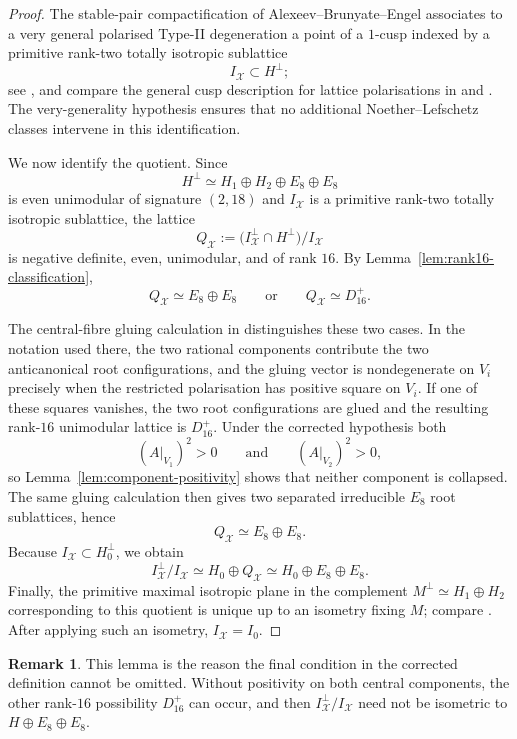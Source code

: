 \documentclass[11pt]{amsart}
\theoremstyle{definition}
\newtheorem{remark}[theorem]{Remark}
\newcommand{\cX}{\mathcal X}
\begin{document}
\begin{proof}
The stable-pair compactification of Alexeev--Brunyate--Engel associates to a
very general polarised Type-II degeneration a point of a $1$-cusp indexed by a
primitive rank-two totally isotropic sublattice
\[
I_{\cX}\subset H^\perp;
\]
see \cite{ABE22}, and compare the general cusp description for lattice
polarisations in \cite[Section~3]{GT24} and \cite[Section~3.1]{DPT23}.  The
very-generality hypothesis ensures that no additional Noether--Lefschetz
classes intervene in this identification.

We now identify the quotient.  Since
\[
H^\perp\simeq H_1\oplus H_2\oplus E_8\oplus E_8
\]
is even unimodular of signature $(2,18)$ and $I_{\cX}$ is a primitive
rank-two totally isotropic sublattice, the lattice
\[
Q_{\cX}
 :=
\bigl(I_{\cX}^{\perp}\cap H^\perp\bigr)/I_{\cX}
\]
is negative definite, even, unimodular, and of rank $16$.  By
Lemma~\ref{lem:rank16-classification},
\[
Q_{\cX}\simeq E_8\oplus E_8
\qquad\text{or}\qquad
Q_{\cX}\simeq D_{16}^{+}.
\]

The central-fibre gluing calculation in \cite[Section~3]{GT24} distinguishes
these two cases.  In the notation used there, the two rational components
contribute the two anticanonical root configurations, and the gluing vector is
nondegenerate on $V_i$ precisely when the restricted polarisation has positive
square on $V_i$.  If one of these squares vanishes, the two root
configurations are glued and the resulting rank-$16$ unimodular lattice is
$D_{16}^{+}$.  Under the corrected hypothesis both
\[
(A|_{V_1})^2>0
\qquad\text{and}\qquad
(A|_{V_2})^2>0,
\]
so Lemma~\ref{lem:component-positivity} shows that neither component is
collapsed.  The same gluing calculation then gives two separated irreducible
$E_8$ root sublattices, hence
\[
Q_{\cX}\simeq E_8\oplus E_8.
\]
Because $I_{\cX}\subset H_0^\perp$, we obtain
\[
I_{\cX}^{\perp}/I_{\cX}
\simeq
H_0\oplus Q_{\cX}
\simeq
H_0\oplus E_8\oplus E_8.
\]
Finally, the primitive maximal isotropic plane in the complement
$M^\perp\simeq H_1\oplus H_2$ corresponding to this quotient is unique up to
an isometry fixing $M$; compare \cite[Section~3.1]{DPT23}.  After applying
such an isometry, $I_{\cX}=I_0$.
\end{proof}

\begin{remark}
This lemma is the reason the final condition in the corrected definition
cannot be omitted.  Without positivity on both central components, the other
rank-$16$ possibility $D_{16}^{+}$ can occur, and then
$I_{\cX}^{\perp}/I_{\cX}$ need not be isometric to
$H\oplus E_8\oplus E_8$.
\end{remark}
\end{document}
